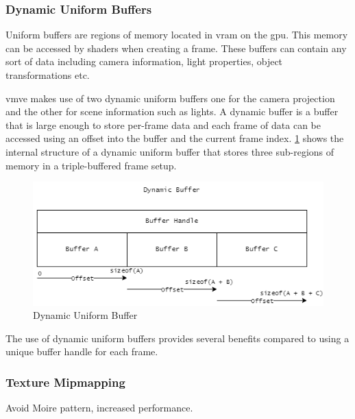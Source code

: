 \documentclass[11pt]{article}
\begin{document}
\subsubsection{Dynamic Uniform Buffers}
Uniform buffers are regions of memory located in \gls{vram} on the \gls{gpu}.
This memory can be accessed by shaders when creating a frame. These buffers can
contain any sort of data including camera information, light properties, object
transformations etc.

\gls{vmve} makes use of two dynamic uniform buffers one for the camera
projection and the other for scene information such as lights. A dynamic buffer
is a buffer that is large enough to store per-frame data and each frame of data
can be accessed using an offset into the buffer and the current frame index.
\ref{fig:dynamic_uniform_buffer} shows the internal structure of a dynamic
uniform buffer that stores three sub-regions of memory in a triple-buffered
frame setup.

\begin{figure}[h!]
  \centering
  \includegraphics[width=\textwidth]{images/dynamic_buffer.png}
  \caption{Dynamic Uniform Buffer}
  \label{fig:dynamic_uniform_buffer}
\end{figure}

The use of dynamic uniform buffers provides several benefits compared to using a
unique buffer handle for each frame.

\subsubsection{Texture Mipmapping}
Avoid Moire pattern, increased performance.
\end{document}
